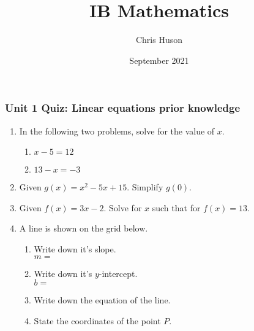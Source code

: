 \documentclass[12pt, twoside]{article}
\title{IB Mathematics}
\author{Chris Huson}
\date{September 2021}
\begin{document}
\subsubsection*{Unit 1 Quiz: Linear equations prior knowledge}
\begin{enumerate}
\item In the following two problems, solve for the value of $x$.
  \begin{multicols}{2}
    \begin{enumerate}
      \item   $x-5=12$ \vspace{6cm}
      \item   $13-x=-3$ \vspace{6cm}
    \end{enumerate}
  \end{multicols}
    \vspace{2.5cm}

\item Given $g(x)=x^2-5x+15$. Simplify $g(0)$. \vspace{3cm}
\item Given $f(x)=3x-2$. Solve for $x$ such that for $f(x)=13$. \vspace{4cm}  

\item A line is shown on the grid below.
\begin{multicols}{2}
\begin{enumerate}
  \item Write down it's slope.\\ $m=$
  \vspace{0.25cm}
  \item Write down it's $y$-intercept.\\ $b=$
  \vspace{0.25cm}
  \item Write down the equation of the line.
  \vspace{1cm}
  \item State the coordinates of the point $P$.
\end{enumerate}
  \begin{center} %
  \end{center}
\end{multicols}


\end{enumerate}
\end{document}
